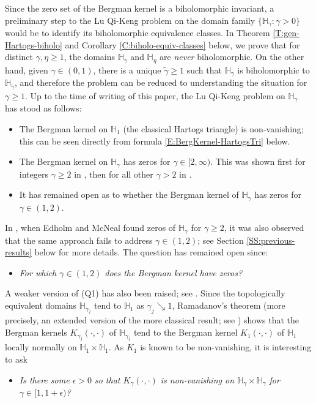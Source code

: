 \documentclass[letterpaper,11pt,reqno]{amsart}
\theoremstyle{plain}
\theoremstyle{definition}
\theoremstyle{remark}
\theoremstyle{remark}
\numberwithin{equation}{section}
\newcommand{\wt}{\widetilde}
\newcommand{\h}{{\mathbb H}}
\begin{document}
Since the zero set of the Bergman kernel is a biholomorphic invariant, a preliminary step to the Lu Qi-Keng problem on the domain family $\{\h_\gamma : \gamma >0 \}$ would be to identify its biholomorphic equivalence classes.
In Theorem \ref{T:gen-Hartogs-biholo} and Corollary \ref{C:biholo-equiv-classes} below, we prove that for distinct $\gamma,\eta \ge 1$, the domains $\h_\gamma$ and $\h_\eta$ are {\em never} biholomorphic.
On the other hand, given $\gamma \in (0,1)$, there is a unique $\wt\gamma \ge 1$ such that $\h_\gamma$ is biholomorphic to $\h_{\wt\gamma}$, and therefore the problem can be reduced to understanding the situation for $\gamma \ge 1$.
Up to the time of writing of this paper, the Lu Qi-Keng problem on $\h_\gamma$ has stood as follows:
\begin{itemize}
\item[$(a)$] The Bergman kernel on $\h_1$ (the classical Hartogs triangle) is non-vanishing; this can be seen directly from formula \eqref{E:BergKernel-HartogsTri} below.
\item[$(b)$] The Bergman kernel on $\h_\gamma$ has zeros for $\gamma \in [2,\infty)$. 
This was shown first  for integers $\gamma \ge 2$ in \cite{Edh16}, then for all other $\gamma>2$ in \cite{EdhMcN16b}.
\item[$(c)$] It has remained open as to whether the Bergman kernel of $\h_\gamma$ has zeros for $\gamma \in (1,2)$.
\end{itemize} 

In \cite{EdhMcN16b}, when Edholm and McNeal found zeros of $\h_\gamma$ for $\gamma \ge 2$, it was also observed that the same approach fails to address $\gamma \in (1,2)$; see Section \ref{SS:previous-results} below for more details. 
The question has remained open since:
\begin{itemize}
\item[{\bf (Q1)}] {\em For which $\gamma \in (1,2)$ does the Bergman kernel have zeros?} \label{Q:which-gamma-in-(1,2)?}
\end{itemize}

A weaker version of (Q1) has also been raised; see \cite{Edh-Thesis}.
Since the topologically equivalent domains $\h_{\gamma_j}$ tend to $\h_1$ as $\gamma_j \searrow 1$, Ramadanov's theorem (more precisely, an extended version of the more classical result; see \cite{Kra06}) shows that the Bergman kernels $K_{\gamma_j}(\cdot,\cdot)$ of $\h_{\gamma_j}$ tend to the Bergman kernel $K_1(\cdot,\cdot)$ of $\h_1$ locally normally on $\h_1 \times \h_1$.
As $K_1$ is known to be non-vanishing, it is interesting to ask
\begin{itemize}
\item[{\bf (Q2)}] {\em Is there some $\epsilon > 0$ so that $K_\gamma(\cdot,\cdot)$ is non-vanishing on $\h_\gamma \times \h_\gamma$ for $\gamma \in [1,1+\epsilon)$?} \label{Q:wiggle-room-non-vanish}
\end{itemize}
\end{document}
